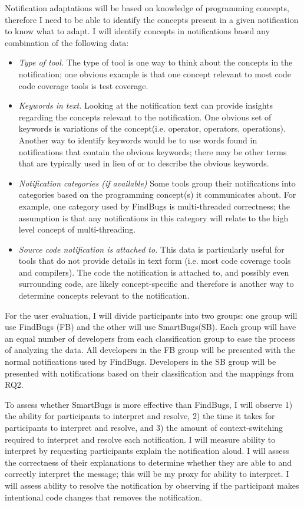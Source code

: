 \documentclass{llncs}
\begin{document}
Notification adaptations will be based on knowledge of programming concepts, therefore I need to be able to identify the concepts present in a given notification to know what to adapt. 
I will identify concepts in notifications based any combination of the following data:
\begin{itemize}
	\item \textit{Type of tool.} The type of tool is one way to think about the concepts in the notification; one obvious example is that one concept relevant to most code code coverage tools is test coverage.
	\item \textit{Keywords in text.} Looking at the notification text can provide insights regarding the concepts relevant to the notification. One obvious set of keywords is variations of the concept(i.e. operator, operators, operations). Another way to identify keywords would be to use words found in notifications that contain the obvious keywords; there may be other terms that are typically used in lieu of or to describe the obvious keywords.
	\item \textit{Notification categories (if available)} Some tools group their notifications into categories based on the programming concept(s) it communicates about. For example, one category used by FindBugs is multi-threaded correctness; the assumption is that any notifications in this category will relate to the high level concept of multi-threading.
	\item \textit{Source code notification is attached to.} This data is particularly useful for tools that do not provide details in text form (i.e. most code coverage tools and compilers). The code the notification is attached to, and possibly even surrounding code, are likely concept-specific and therefore is another way to determine concepts relevant to the notification.
\end{itemize}

For the user evaluation, I will divide participants into two groups: one group will use FindBugs (FB) and the other will use SmartBugs(SB). Each group will have an equal number of developers from each classification group to ease the process of analyzing the data. All developers in the FB group will be presented with the normal notifications used by FindBugs. Developers in the SB group will be presented with notifications based on their classification and the mappings from RQ2.

To assess whether SmartBugs is more effective than FindBugs, I will observe 1) the ability for participants to interpret and resolve, 2) the time it takes for participants to interpret and resolve, and 3) the amount of context-switching required to interpret and resolve each notification. I will measure ability to interpret by requesting participants explain the notification aloud. I will assess the correctness of their explanations to determine whether they are able to and correctly interpret the message; this will be my proxy for ability to interpret. I will assess ability to resolve the notification by observing if the participant makes intentional code changes that removes the notification.
\end{document}
